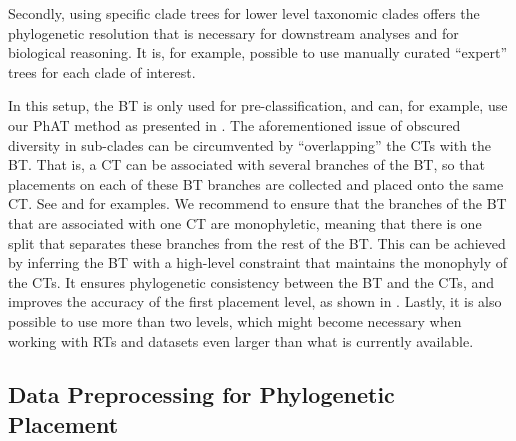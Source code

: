Secondly, using specific clade trees for lower level taxonomic clades offers the phylogenetic resolution
that is necessary for downstream analyses and for biological reasoning.
It is, for example, possible to use manually curated ``expert'' trees for each clade of interest.

In this setup, the \ac{BT} is only used for pre-classification,
and can, for example, use our \ac{PhAT} method as presented in .
The aforementioned issue of obscured diversity in sub-clades can be circumvented
by ``overlapping'' the \acp{CT} with the \ac{BT}.
That is, a \ac{CT} can be associated with several branches of the \ac{BT},
so that placements on each of these \ac{BT} branches are collected and placed onto the same \ac{CT}.
See  and  for examples.
We recommend to ensure that the branches of the \ac{BT} that are associated with one \ac{CT} are monophyletic,
meaning that there is one split that separates these branches from the rest of the \ac{BT}.
This can be achieved by inferring the \ac{BT} with a high-level constraint that maintains the monophyly of the \acp{CT}.
It ensures phylogenetic consistency between the \ac{BT} and the \acp{CT},
and improves the accuracy of the first placement level,
as shown in .
Lastly, it is also possible to use more than two levels,
which might become necessary when working with \acp{RT} and datasets even larger than what is currently available.


\subsection{Data Preprocessing for Phylogenetic Placement}
\label{ch:AutomaticTrees:sec:Methods:sub:DataPreprocessing}

